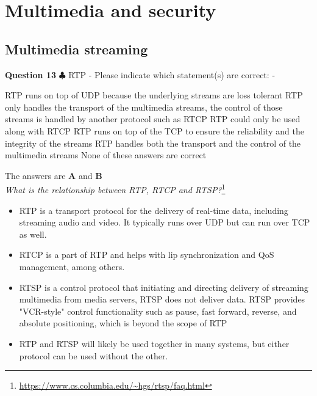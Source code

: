 \documentclass[en]{sourcefiles/eplexam}
\newcounter{choice}
\renewcommand\thechoice{\textbf{\Alph{choice}}}
\newcommand\choicelabel{\thechoice$\quad$}
\newenvironment{choices}%
  {\list{\choicelabel}%
     {\usecounter{choice}\def\makelabel##1{\hss\llap{##1}}%
       \settowidth{\leftmargin}{W.\hskip\labelsep\hskip 2.5em}%
       \def\choice{%
         \item
       } %
       \labelwidth\leftmargin\advance\labelwidth-\labelsep
       \topsep=0pt
       \partopsep=0pt
     }%
  }%
  {\endlist}
\begin{document}
\pagebreak
\section{Multimedia and security}
\subsection{Multimedia streaming}

\textbf{Question 13} $\clubsuit$ RTP - Please indicate which statement(s) are correct:
\begin{choices}
     \choice RTP runs on top of UDP because the underlying streams are loss tolerant
     \choice RTP only handles the transport of the multimedia streams, the control of those streams is handled by another protocol such as RTCP
     \choice RTP could only be used along with RTCP
     \choice RTP runs on top of the TCP to ensure the reliability and the integrity of the streams
     \choice RTP handles both the transport and the control of the multimedia streams
    \choice None of these answers are correct
\end{choices}
\begin{solution}
The answers are \textbf{A} and \textbf{B}\\


\noindent \textit{What is the relationship between RTP, RTCP and RTSP?}\footnote{\url{https://www.cs.columbia.edu/~hgs/rtsp/faq.html}}
\begin{itemize}
    \item RTP is a transport protocol for the delivery of real-time data, including streaming audio and video. It typically runs over UDP but can run over TCP as well.
    \item RTCP is a part of RTP and helps with lip synchronization and QoS management, among others.
    \item RTSP is a control protocol that initiating and directing delivery of streaming multimedia from media servers,  RTSP does not deliver data. RTSP provides "VCR-style" control functionality such as pause, fast forward, reverse, and absolute positioning, which is beyond the scope of RTP
    \item  RTP and RTSP will likely be used together in many systems, but either protocol can be used without the other.
\end{itemize}




\end{solution}
\end{document}
